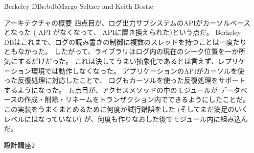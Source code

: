 \begin{aosachapter}{Berkeley DB}{s:bdb}{Margo Seltzer and Keith Bostic}
\begin{aosasect1}{アーキテクチャの概要}
四点目が、ログ出力サブシステムのAPIがカーソルベースとなった
( API がなくなって、 APIに置き換えられた)という点だ。
Berkeley DBはこれまで、ログの読み書きの制御に複数のスレッドを持つことは一度たりともなかった。
したがって、ライブラリはログ内の現在のシーク位置を一か所気にするだけだった。
これは決してうまい抽象化であるとは言えず、レプリケーション環境では動作しなくなった。
アプリケーションのAPIがカーソルを使った反復処理に対応したことで、
ログもカーソルを使った反復処理をサポートするようになった。
五点目が、アクセスメソッドの中のモジュールが
データベースの作成・削除・リネームをトランザクション内でできるようにしたことだ。
この実装をうまくまとめるために何度か試行錯誤をした
(そしてまだ満足のいくレベルにはなっていない)
が、何度も作りなおした後でモジュール内に組み込んだ。

\begin{aosabox}{設計講座2}


\end{aosabox}
\end{aosasect1}
\end{aosachapter}
